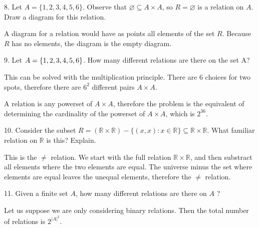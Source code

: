 \documentclass[openany, 12pt]{book}
\begin{document}
\begin{exercise}{}{}
	{8. Let $A=\{1,2,3,4,5,6\}$. Observe that $\varnothing \subseteq A \times A$, so $R=\varnothing$ is a relation on $A$. Draw a diagram for this relation.}
	\begin{alist}
		\item A diagram for a relation would have as points all elements of the set $R$.
		Because $R$ has no elements, the diagram is the empty diagram.
	\end{alist}
\end{exercise}

\begin{exercise}{}{}
	{9. Let $A = \{1,2,3,4,5,6\}$. How many different relations are there on the set A?}
	\begin{alist}
		\item This can be solved with the multiplication principle. There are 6 choices
		for two spots, therefore there are $6^2$ different pairs $A\times A$.
		\item A relation is any powerset of $A\times A$, therefore the problem is the
		equivalent of determining the cardinality of the powerset of $A\times A$,
		which is $2^{36}$.
	\end{alist}
\end{exercise}

\begin{exercise}{}{}
	{10. Consider the subset $R=(\mathbb{R} \times \mathbb{R})-\{(x, x): x \in
			\mathbb{R}\} \subseteq \mathbb{R} \times \mathbb{R}$. What familiar relation
		on $\mathbb{R}$ is this? Explain.}
	\begin{alist}
		\item This is the $\neq$ relation. We start with the full relation $\mathbb{R}
			\times \mathbb{R}$, and then substract all elements where the two elements
		are equal.  The universe minus the set where elements are equal leaves the
		unequal elements, therefore the $\neq$ relation.
	\end{alist}
\end{exercise}

\begin{exercise}{}{}
	{11. Given a finite set $A$, how many different relations are there on $A$ ?}
	\begin{alist}
		\item Let us suppose we are only considering binary relations. Then the total
		number of relations is $2^{|A|^2}$.
	\end{alist}
\end{exercise}
\end{document}
